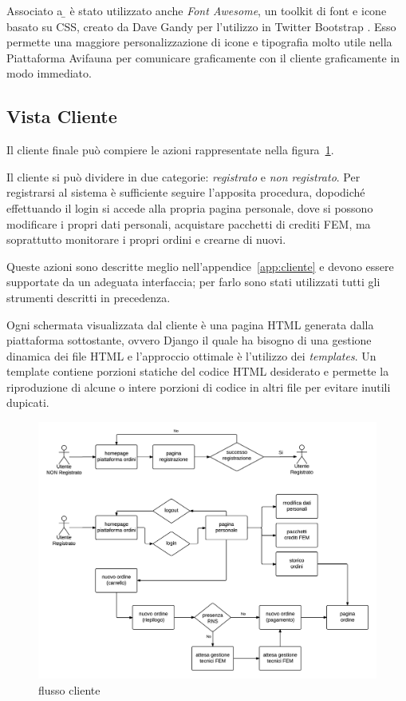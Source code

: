 Associato a {\b} è stato utilizzato anche \emph{Font Awesome}, un toolkit di font e icone basato su CSS, creato da Dave Gandy per l'utilizzo in Twitter Bootstrap \cite{fontawesome} \cite{fontawesome-github}. Esso permette una maggiore personalizzazione di icone e tipografia molto utile nella Piattaforma Avifauna per comunicare graficamente con il cliente graficamente in modo immediato.

\newpage
\subsection{Vista Cliente}
\label{subs:cliente}
Il cliente finale può compiere le azioni rappresentate nella figura~\ref{fig:flusso-cliente}.

Il cliente si può dividere in due categorie: \emph{registrato} e \emph{non registrato}. Per registrarsi al sistema è sufficiente seguire l'apposita procedura, dopodiché effettuando il login si accede alla propria pagina personale, dove si possono modificare i propri dati personali, acquistare pacchetti di crediti FEM, ma soprattutto monitorare i propri ordini e crearne di nuovi. 

Queste azioni sono descritte meglio nell'appendice~\ref{app:cliente} e devono essere supportate da un adeguata interfaccia; per farlo sono stati utilizzati tutti gli strumenti descritti in precedenza.

Ogni schermata visualizzata dal cliente è una pagina HTML generata dalla piattaforma sottostante, ovvero Django il quale ha bisogno di una gestione dinamica dei file HTML e l'approccio ottimale è l'utilizzo dei \emph{templates}.
Un template contiene porzioni statiche del codice HTML desiderato e permette la riproduzione di alcune o intere porzioni di codice in altri file per evitare inutili dupicati.

\begin{figure}
 \includegraphics[width=1\textwidth]{images/flusso-cliente} 
 \caption{flusso cliente}
 \label{fig:flusso-cliente}
\end{figure}

